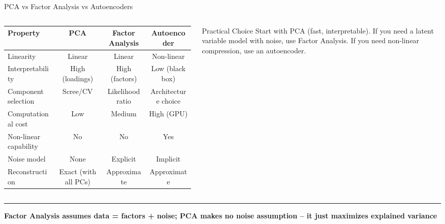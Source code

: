 \documentclass[8pt,aspectratio=169]{beamer}
\newcommand{\bottomnote}[1]{%
\vfill
\vspace{-2mm}
\textcolor{mllavender2}{\rule{\textwidth}{0.4pt}}
\vspace{1mm}
\footnotesize
\textbf{#1}
}
\begin{document}
\begin{frame}[t]{PCA vs Factor Analysis vs Autoencoders}
\begin{columns}[T]
\small

\vspace{1mm}
\footnotesize
\begin{tabular}{@{}l c c c@{}}
\toprule
\textbf{Property} & \textbf{PCA} & \textbf{Factor Analysis} & \textbf{Autoencoder} \\
\midrule
\rowcolor{mllavender4}
Linearity & Linear & Linear & Non-linear \\
Interpretability & High (loadings) & High (factors) & Low (black box) \\
\rowcolor{mllavender4}
Component selection & Scree/CV & Likelihood ratio & Architecture choice \\
Computational cost & Low & Medium & High (GPU) \\
\rowcolor{mllavender4}
Non-linear capability & No & No & Yes \\
Noise model & None & Explicit & Implicit \\
\rowcolor{mllavender4}
Reconstruction & Exact (with all PCs) & Approximate & Approximate \\
\bottomrule
\end{tabular}

\vspace{3mm}
\begin{block}{Practical Choice}
\scriptsize Start with PCA (fast, interpretable). If you need a latent variable model with noise, use Factor Analysis. If you need non-linear compression, use an autoencoder.
\end{block}
\end{columns}

\bottomnote{Factor Analysis assumes data = factors + noise; PCA makes no noise assumption -- it just maximizes explained variance}
\end{frame}
\end{document}
